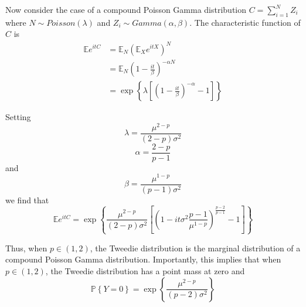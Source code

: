 \documentclass[11pt]{article}
\begin{document}
Now consider the case of a compound Poisson Gamma distribution $C = \sum_{i=1}^N Z_i$ where $N \sim Poisson \left( \lambda \right)$ and $Z_i \sim Gamma \left( \alpha, \beta \right)$. The characteristic function of $C$ is
\begin{equation}
\begin{split}
\mathbb{E} e^{itC} & = \mathbb{E}_N \left( \mathbb{E}_X e^{itX} \right)^N \\
& = \mathbb{E}_N \left( 1 - \frac{it}{\beta} \right)^{-\alpha N} \\
& = \exp \left\{ \lambda \left[ \left( 1 - \frac{it}{\beta} \right)^{-\alpha} - 1 \right] \right\}
\end{split}
\end{equation}

Setting
\begin{equation}
\lambda = \frac{\mu^{2-p}}{\left( 2- p  \right) \sigma^2}
\end{equation}
\begin{equation}
\alpha = \frac{2-p}{p-1}
\end{equation}
and
\begin{equation}
\beta = \frac{\mu^{1-p}}{\left( p - 1 \right) \sigma^2}
\end{equation}
we find that
\begin{equation}
\mathbb{E} e^{itC} = \exp \left\{ \frac{\mu^{2-p}}{\left( 2 - p \right) \sigma^2} \left[ \left( 1 - it\sigma^2 \frac{p-1}{\mu^{1-p}} \right)^{\frac{p-2}{p-1}} - 1\right] \right\}
\end{equation}

Thus, when $p \in \left( 1 , 2 \right)$, the Tweedie distribution is the marginal distribution of a compound Poisson Gamma distribution. Importantly, this implies that when $p \in \left( 1 , 2 \right)$, the Tweedie distribution has a point mass at zero and
\begin{equation}
\mathbb{P} \left\{ Y = 0 \right\} = \exp \left\{ \frac{\mu^{2-p}}{\left( p - 2 \right) \sigma^2} \right\}
\end{equation}
\end{document}
